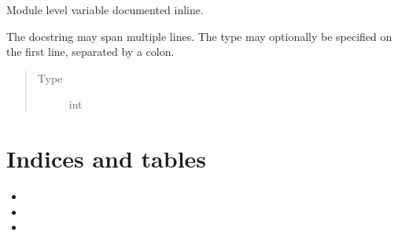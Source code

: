 \documentclass[letterpaper,10pt,english]{sphinxmanual}
\begin{document}

\begin{fulllineitems}
\label{\detokenize{source/example:example.module_level_variable2}}
\pysigstartsignatures
{}
\pysigstopsignatures
\sphinxAtStartPar
Module level variable documented inline.

\sphinxAtStartPar
The docstring may span multiple lines. The type may optionally be specified
on the first line, separated by a colon.
\begin{quote}\begin{description}
\item[{Type}] \leavevmode
\sphinxAtStartPar
int

\end{description}\end{quote}

\end{fulllineitems}



\chapter{Indices and tables}
\label{\detokenize{index:indices-and-tables}}\begin{itemize}
\item {} 
\sphinxAtStartPar
{}

\item {} 
\sphinxAtStartPar
{}

\item {} 
\sphinxAtStartPar
{}

\end{itemize}


\renewcommand{\indexname}{Python Module Index}
\begin{sphinxtheindex}
\let\bigletter\sphinxstyleindexlettergroup
\bigletter{e}
\item\relax{}
\end{sphinxtheindex}

\renewcommand{\indexname}{Index}
\printindex
\end{document}
